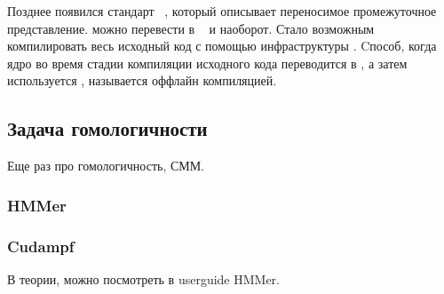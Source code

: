 Позднее появился стандарт ~\cite{SPIR-V}, который описывает 
переносимое промежуточное представление.
 можно перевести в ~\cite{LLVM} и наоборот.
Стало возможным компилировать весь исходный код с помощью 
инфраструктуры .
Cпособ, когда ядро во время стадии компиляции исходного кода переводится в
, а затем используется , 
называется оффлайн компиляцией.


\subsection{Задача гомологичности}
Еще раз про гомологичность, СММ.
\subsubsection{HMMer}
\subsubsection{Cudampf}

В теории, можно посмотреть в userguide HMMer.
